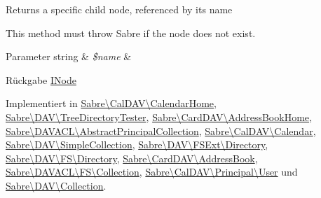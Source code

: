 Returns a specific child node, referenced by its name

This method must throw Sabre if the node does not exist.


\begin{DoxyParams}[1]{Parameter}
string & {\em \$name} & \\
\hline
\end{DoxyParams}
\begin{DoxyReturn}{Rückgabe}
\mbox{\hyperlink{interface_sabre_1_1_d_a_v_1_1_i_node}{I\+Node}} 
\end{DoxyReturn}


Implementiert in \mbox{\hyperlink{class_sabre_1_1_cal_d_a_v_1_1_calendar_home_a3bec69b865192277e087af7d3ec9da46}{Sabre\textbackslash{}\+Cal\+D\+A\+V\textbackslash{}\+Calendar\+Home}}, \mbox{\hyperlink{class_sabre_1_1_d_a_v_1_1_tree_directory_tester_af843be3a9a6ffd2a67572e8ab4a9c261}{Sabre\textbackslash{}\+D\+A\+V\textbackslash{}\+Tree\+Directory\+Tester}}, \mbox{\hyperlink{class_sabre_1_1_card_d_a_v_1_1_address_book_home_ae7b3aaf05451966e44a11ce81f97ea28}{Sabre\textbackslash{}\+Card\+D\+A\+V\textbackslash{}\+Address\+Book\+Home}}, \mbox{\hyperlink{class_sabre_1_1_d_a_v_a_c_l_1_1_abstract_principal_collection_a98e600c953e0ffa2b0736bac07fd51c1}{Sabre\textbackslash{}\+D\+A\+V\+A\+C\+L\textbackslash{}\+Abstract\+Principal\+Collection}}, \mbox{\hyperlink{class_sabre_1_1_cal_d_a_v_1_1_calendar_a79a4bc9d8be2331ab1891ace08a13a9a}{Sabre\textbackslash{}\+Cal\+D\+A\+V\textbackslash{}\+Calendar}}, \mbox{\hyperlink{class_sabre_1_1_d_a_v_1_1_simple_collection_af59d485179f257e2aea9bb2985ade514}{Sabre\textbackslash{}\+D\+A\+V\textbackslash{}\+Simple\+Collection}}, \mbox{\hyperlink{class_sabre_1_1_d_a_v_1_1_f_s_ext_1_1_directory_a48a768e92b00f3d33f567830a7be8932}{Sabre\textbackslash{}\+D\+A\+V\textbackslash{}\+F\+S\+Ext\textbackslash{}\+Directory}}, \mbox{\hyperlink{class_sabre_1_1_d_a_v_1_1_f_s_1_1_directory_afb99c60f4a32c08a46d6bf3aa77e1089}{Sabre\textbackslash{}\+D\+A\+V\textbackslash{}\+F\+S\textbackslash{}\+Directory}}, \mbox{\hyperlink{class_sabre_1_1_card_d_a_v_1_1_address_book_aec8e795845ea7326b2fbe8198769e4cc}{Sabre\textbackslash{}\+Card\+D\+A\+V\textbackslash{}\+Address\+Book}}, \mbox{\hyperlink{class_sabre_1_1_d_a_v_a_c_l_1_1_f_s_1_1_collection_adeea47e4d71cd6ae12100e49b46b1d2b}{Sabre\textbackslash{}\+D\+A\+V\+A\+C\+L\textbackslash{}\+F\+S\textbackslash{}\+Collection}}, \mbox{\hyperlink{class_sabre_1_1_cal_d_a_v_1_1_principal_1_1_user_a8cfa81741e17a5489ea7c33306407d72}{Sabre\textbackslash{}\+Cal\+D\+A\+V\textbackslash{}\+Principal\textbackslash{}\+User}} und \mbox{\hyperlink{class_sabre_1_1_d_a_v_1_1_collection_ab9ce539f25ea9222f3a3bfd4d9673c02}{Sabre\textbackslash{}\+D\+A\+V\textbackslash{}\+Collection}}.

